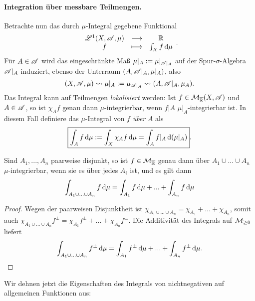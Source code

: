 \paragraph{Integration über messbare Teilmengen.}
Betrachte nun das durch $\mu$-Integral gegebene Funktional
\begin{equation*}
\begin{array}{ccc}
\LL^1(X,\AA,\mu) & \longrightarrow & \R \\
f & \longmapsto & \int_X f \D \mu
\end{array}.
\end{equation*}
Für $A\in \AA$ wird das eingeschränkte Maß $\mu|_A:=\mu|_{\AA|_A}$ auf der Spur-$\sigma$-Algebra $\AA|_A$ induziert, ebenso der Unterraum $(A,\AA|_A,\mu|_A)$, also
$$(X,\AA,\mu) \leadsto \mu|_A:=\mu_{\AA|_A}\leadsto (A,\AA|_A,\mu_A).$$
Das Integral kann auf Teilmengen \emph{lokalisiert} werden: Ist $f\in \MM_{\ol\R}(X,\AA)$ und $A\in\AA$, so ist $\chi_A f$ genau dann $\mu$-integrierbar, wenn $f|A$ $\mu|_A$-integrierbar ist. In diesem Fall definiere das $\mu$-Integral von $f$ \emph{über} $A$ als
$$
\boxed{
\int_A f \D \mu := \int_X \chi_Af\D\mu = \int_Af|_A \D (\mu|_A)
}.$$
\begin{lemma} \label{integral-zerlegung}
\begin{mdframed}
Sind $A_1,...,A_n$ paarweise disjunkt, so ist $f\in \MM_{\ol\R}$ genau dann über $A_1\cup ... \cup A_n$ $\mu$-integrierbar, wenn sie es über jedes $A_i$ ist, und es gilt dann
$$
\int_{A_1\cup...\cup A_n} f \D\mu = \int_{A_1}f\D \mu + ... + \int_{A_n} f \D \mu
$$
\end{mdframed}
\begin{proof}
Wegen der paarweisen Disjunktheit ist $\chi_{A_1\cup...\cup A_n}=\chi_{A_1}+...+\chi_{A_n}$, somit auch $\chi_{A_1\cup...\cup A_n}f^\pm=\chi_{A_1}f^\pm+...+\chi_{A_n}f^\pm$. Die Additivität des Integrals auf $\MM_{\geq 0}$ liefert
$$
\int_{A_1\cup...\cup A_n} f^\pm \D\mu=\int_{A_1}f^\pm \D\mu + ... +\int_{A_n}f^\pm \D \mu.
$$
\end{proof}
\end{lemma}
Wir dehnen jetzt die Eigenschaften des Integrals von nichtnegativen auf allgemeinen Funktionen aus:


